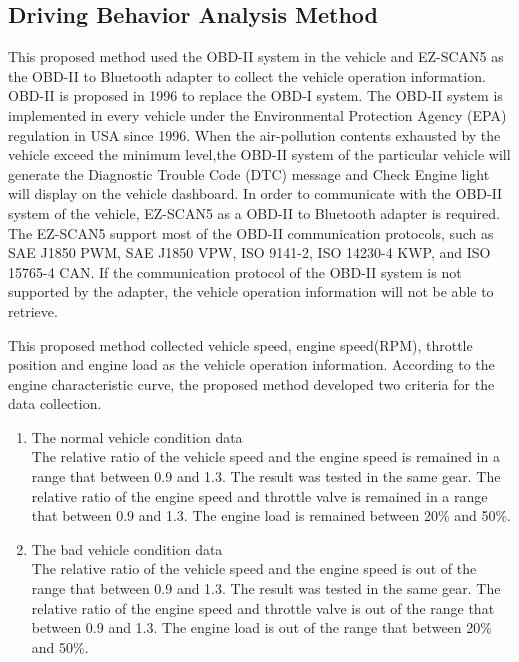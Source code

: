 \subsection{Driving Behavior Analysis Method}
This proposed method used the OBD-II system in the vehicle and EZ-SCAN5 as the OBD-II to Bluetooth adapter to collect the vehicle operation information. OBD-II is proposed in 1996 to replace the OBD-I system. The OBD-II system is implemented in every vehicle under the Environmental Protection Agency (EPA) regulation in USA since 1996. When the air-pollution contents exhausted by the vehicle exceed the minimum level,the OBD-II system of the particular vehicle will generate the Diagnostic Trouble Code (DTC) message and Check Engine light will display on the vehicle dashboard. In order to communicate with the OBD-II system of the vehicle, EZ-SCAN5 as a OBD-II to Bluetooth adapter is required. The EZ-SCAN5 support most of the OBD-II communication protocols, such as SAE J1850 PWM, SAE J1850 VPW, ISO 9141-2, ISO 14230-4 KWP, and ISO 15765-4 CAN. If the communication protocol of the OBD-II system is not supported by the adapter, the vehicle operation information will not be able to retrieve.

This proposed method collected vehicle speed, engine speed(RPM), throttle position and engine load as the vehicle operation information. According to the engine characteristic curve, the proposed method developed two criteria for the data collection.

\begin{enumerate}
\item The normal vehicle condition data \\
The relative ratio of the vehicle speed and the engine speed is remained in a range that between 0.9 and 1.3. The result was tested in the same gear. The relative ratio of the engine speed and throttle valve is remained in a range that between 0.9 and 1.3. The engine load is remained between 20\% and 50\%.  
\item The bad vehicle condition data \\
The relative ratio of the vehicle speed and the engine speed is out of the range that between 0.9 and 1.3. The result was tested in the same gear. The relative ratio of the engine speed and throttle valve is out of the range that between 0.9 and 1.3. The engine load is out of the range that between 20\% and 50\%.
\end{enumerate}

